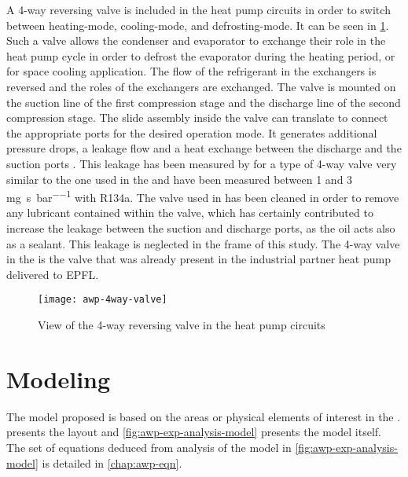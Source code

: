 A 4-way reversing valve is included in the heat pump circuits in order
to switch between heating-mode, cooling-mode, and defrosting-mode. It
can be seen in \cref{fig:awp-4way-valve-in-circuits}. Such a valve
allows the condenser and evaporator to exchange their role in the heat
pump cycle in order to defrost the evaporator during the heating
period, or for space cooling application. The flow of the refrigerant
in the exchangers is reversed and the roles of the exchangers are
exchanged. The valve is mounted on the suction line of the first
compression stage and the discharge line of the second compression
stage. The slide assembly inside the valve can translate to connect
the appropriate ports for the desired operation mode. It generates
additional pressure drops, a leakage flow and a heat exchange between
the discharge and the suction ports
\citep[p.\,4]{bertsch-hubacher-2002a}. This leakage has been measured
by \citet[p.\,39]{bertsch-hubacher-2002a} for a type of 4-way valve
very similar to the one used in the \AWP{} and have been measured
between 1 and 3 \si{\milli\gram\per\second\per\bar} with R134a. The
valve used in \AWP{} has been cleaned in order to remove any lubricant
contained within the valve,
which has certainly contributed to increase the leakage between the
suction and discharge ports, as the oil acts also as a sealant. This
leakage is neglected in the frame of this study. The 4-way valve in
the \AWP{} is the valve that was already present in the industrial
partner heat pump delivered to EPFL.

\begin{figure}[htbp]
  \centering
  \texttt{[image: awp-4way-valve]}
  \caption{View of the 4-way reversing valve in the heat pump circuits}
  \label{fig:awp-4way-valve-in-circuits}
\end{figure}


\section{Modeling}
\label{sec:awp-model}

The model proposed is based on the areas or physical elements of
interest in the \AWP{}.  presents
the \AWP{} layout and \cref{fig:awp-exp-analysis-model} presents the
model itself. The set of equations deduced from analysis of the model
in \cref{fig:awp-exp-analysis-model} is detailed in
\cref{chap:awp-eqn}.

